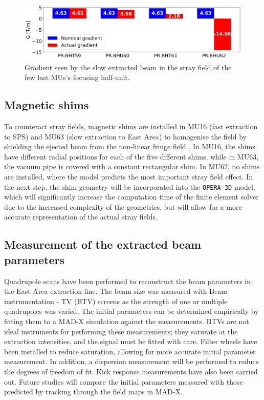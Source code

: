 \documentclass[a4paper,
               biblatex,     %
               keeplastbox,   %
               ]{jacow}
\begin{document}
\begin{figure}[!htb]
   \centering
   \includegraphics*[width=1.0\columnwidth]{MOPOTK030_f7.png}
   \caption{Gradient seen by the slow extracted beam in the stray field of the few last MUs's focusing half-unit.}
   \label{fig:stray field gradients}
\end{figure}

\subsection{Magnetic shims}

To counteract stray fields, magnetic shims are installed in MU16 (fast extraction to SPS) and MU63 (slow extraction to East Area) to homogenise the field by shielding the ejected beam from the non-linear fringe field \cite{zickler_influence_nodate}. In MU16, the shims have different radial positions for each of the five different shims, while in MU63, the vacuum pipe is covered with a constant rectangular shim. In MU62, no shims are installed, where the model predicts the most important stray field effect. In the next step, the shim geometry will be incorporated into the \texttt{OPERA-3D} model, which will significantly increase the computation time of the finite element solver due to the increased complexity of the geometries, but will allow for a more accurate representation of the actual stray fields.

\subsection{Measurement of the extracted beam parameters}

Quadrupole scans have been performed to reconstruct the beam parameters in the East Area extraction line. The beam size was measured with Beam instrumentation - TV (BTV) screens as the strength of one or multiple quadrupoles was varied. The initial parameters can be determined empirically by fitting them to a MAD-X simulation against the measurements. BTVs are not ideal instruments for performing these measurements; they saturate at the extraction intensities, and the signal must be fitted with care. Filter wheels have been installed to reduce saturation, allowing for more accurate initial parameter measurement. In addition, a dispersion measurement will be performed to reduce the degrees of freedom of fit.
Kick response measurements have also been carried out. Future studies will compare the initial parameters measured with those predicted by tracking through the field maps in MAD-X.
\end{document}
